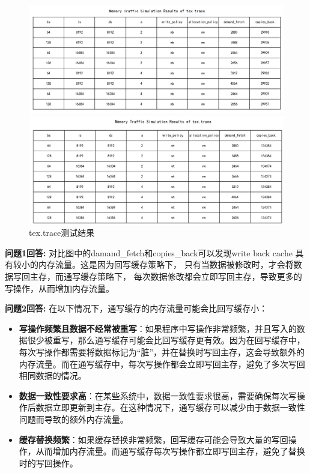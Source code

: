 \documentclass[12pt,hyperref,a4paper,UTF8]{ctexart}
\begin{document}
\begin{figure}[H]
    \centering
    \begin{minipage}[b]{0.45\textwidth}
        \centering
        \includegraphics[width=\textwidth]{./figures/fig/image37.png}
    \end{minipage}
    \hfill
    \begin{minipage}[b]{0.45\textwidth}
        \centering
        \includegraphics[width=\textwidth]{./figures/fig/image38.png}
    \end{minipage}
    \caption{tex.trace测试结果}
\end{figure}




\textbf{问题1回答:}
对比图中的damand\_fetch和copies\_back可以发现write back cache
具有较小的内存流量。这是因为回写缓存策略下，
只有当数据被修改时，才会将数据写回主存，而通写缓存策略下，
每次数据修改都会立即写回主存，导致更多的写操作，从而增加内存流量。



\textbf{问题2回答:}
在以下情况下，通写缓存的内存流量可能会比回写缓存小：

\begin{itemize}
    \item \textbf{写操作频繁且数据不经常被重写}：如果程序中写操作非常频繁，并且写入的数据很少被重写，那么通写缓存可能会比回写缓存更有效。因为在回写缓存中，每次写操作都需要将数据标记为“脏”，并在替换时写回主存，这会导致额外的内存流量。而在通写缓存中，每次写操作都会立即写回主存，避免了多次写回相同数据的情况。
    \item \textbf{数据一致性要求高}：在某些系统中，数据一致性要求很高，需要确保每次写操作后数据立即更新到主存。在这种情况下，通写缓存可以减少由于数据一致性问题而导致的额外内存流量。
    \item \textbf{缓存替换频繁}：如果缓存替换非常频繁，回写缓存可能会导致大量的写回操作，从而增加内存流量。而通写缓存每次写操作都立即写回主存，避免了替换时的写回操作。
\end{itemize}
\end{document}
